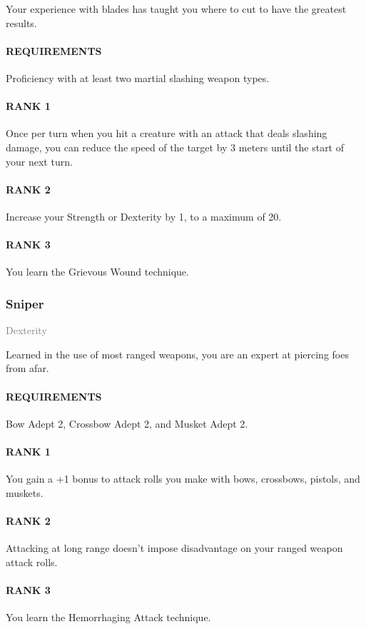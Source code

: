 \normalsize
Your experience with blades has taught you where to cut to have the greatest results.
\paragraph{REQUIREMENTS} Proficiency with at least two martial slashing weapon types.
\paragraph{RANK 1} Once per turn when you hit a creature with an attack that deals slashing damage, you can reduce the speed of the target by 3 meters until the start of your next turn.
\paragraph{RANK 2} Increase your Strength or Dexterity by 1, to a maximum of 20.
\paragraph{RANK 3} You learn the Grievous Wound technique.

\subsubsection{Sniper} \label{feat::sniper}
\small{\textcolor{gray}{Dexterity}}

\normalsize
Learned in the use of most ranged weapons, you are an expert at piercing foes from afar.
\paragraph{REQUIREMENTS} Bow Adept 2, Crossbow Adept 2, and Musket Adept 2.
\paragraph{RANK 1} You gain a +1 bonus to attack rolls you make with bows, crossbows, pistols, and muskets.
\paragraph{RANK 2} Attacking at long range doesn't impose disadvantage on your ranged weapon attack rolls.
\paragraph{RANK 3} You learn the Hemorrhaging Attack technique.

